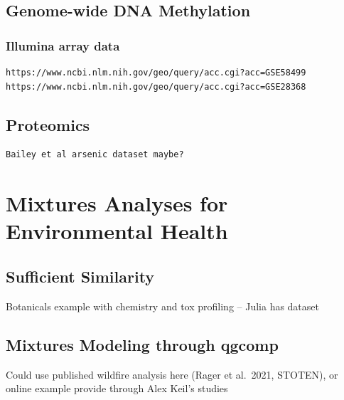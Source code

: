 \documentclass[
]{book}
\begin{document}
\hypertarget{genome-wide-dna-methylation}{%
\section{Genome-wide DNA Methylation}\label{genome-wide-dna-methylation}}

\hypertarget{illumina-array-data}{%
\subsection{Illumina array data}\label{illumina-array-data}}

\begin{verbatim}
https://www.ncbi.nlm.nih.gov/geo/query/acc.cgi?acc=GSE58499
https://www.ncbi.nlm.nih.gov/geo/query/acc.cgi?acc=GSE28368
\end{verbatim}

\hypertarget{proteomics}{%
\section{Proteomics}\label{proteomics}}

\begin{verbatim}
Bailey et al arsenic dataset maybe?
\end{verbatim}

\hypertarget{mixtures-analyses-for-environmental-health}{%
\chapter{Mixtures Analyses for Environmental Health}\label{mixtures-analyses-for-environmental-health}}

\hypertarget{sufficient-similarity}{%
\section{Sufficient Similarity}\label{sufficient-similarity}}

Botanicals example with chemistry and tox profiling -- Julia has dataset

\hypertarget{mixtures-modeling-through-qgcomp}{%
\section{Mixtures Modeling through qgcomp}\label{mixtures-modeling-through-qgcomp}}

Could use published wildfire analysis here (Rager et al.~2021, STOTEN), or online example provide through Alex Keil's studies
\end{document}
